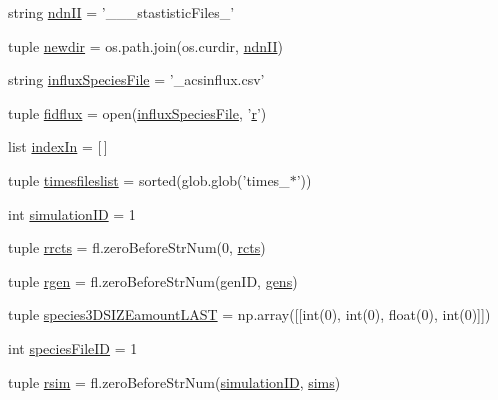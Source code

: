 \begin{DoxyCompactItemize}
string \hyperlink{namespacegeneral_statistics_a7ccf9a2d306ba41029a6c988dea19484}{ndn\-I\-I} = '\-\_\-\-\_\-\_\-stastistic\-Files\-\_\-'
\item 
tuple \hyperlink{namespacegeneral_statistics_a862af869b2c09a9bcb32f2c159d387e8}{newdir} = os.\-path.\-join(os.\-curdir, \hyperlink{namespacegeneral_statistics_a7ccf9a2d306ba41029a6c988dea19484}{ndn\-I\-I})
\item 
string \hyperlink{namespacegeneral_statistics_adfaa9da42539b29b71a53ddb2da53688}{influx\-Species\-File} = '\-\_\-acsinflux.\-csv'
\item 
tuple \hyperlink{namespacegeneral_statistics_a709d2fc5d6a459dbc9c4a04023635a20}{fidflux} = open(\hyperlink{namespacegeneral_statistics_adfaa9da42539b29b71a53ddb2da53688}{influx\-Species\-File}, '\hyperlink{_k_s_search_launcher_8m_ac862e7284527eb913b1351c8bfb8e079}{r}')
\item 
list \hyperlink{namespacegeneral_statistics_a5182af5b7ba2ac034a2be23a49197e8e}{index\-In} = \mbox{[}$\,$\mbox{]}
\item 
tuple \hyperlink{namespacegeneral_statistics_a999cd7acfeb999ca44418154c38bd0f6}{timesfileslist} = sorted(glob.\-glob('times\-\_\-$\ast$'))
\item 
int \hyperlink{namespacegeneral_statistics_a6f463c2d878793522d2ac91f1aaa8bc2}{simulation\-I\-D} = 1
\item 
tuple \hyperlink{namespacegeneral_statistics_a6cf3e4aec08e23edc7453e9dc795360e}{rrcts} = fl.\-zero\-Before\-Str\-Num(0, \hyperlink{namespacegeneral_statistics_a96c2985cd728ad6a5b6b5da7ae6d410e}{rcts})
\item 
tuple \hyperlink{namespacegeneral_statistics_a9f0e3da38cc8d932786debb2d495a13b}{rgen} = fl.\-zero\-Before\-Str\-Num(gen\-I\-D, \hyperlink{namespacegeneral_statistics_a973d65dc8f8e3c00253543a466ec0482}{gens})
\item 
tuple \hyperlink{namespacegeneral_statistics_a34b463634037dcf1dff3e5c03eb9d169}{species3\-D\-S\-I\-Z\-Eamount\-L\-A\-S\-T} = np.\-array(\mbox{[}\mbox{[}int(0), int(0), float(0), int(0)\mbox{]}\mbox{]})
\item 
int \hyperlink{namespacegeneral_statistics_a6b94bc4781eb4017a82145d7e6260e61}{species\-File\-I\-D} = 1
\item 
tuple \hyperlink{namespacegeneral_statistics_a2dfa50767faeb2e6493518af2b17dec0}{rsim} = fl.\-zero\-Before\-Str\-Num(\hyperlink{namespacegeneral_statistics_a6f463c2d878793522d2ac91f1aaa8bc2}{simulation\-I\-D}, \hyperlink{namespacegeneral_statistics_ab1c429f24e411b4f961a86e7a3f53cf1}{sims})

\end{DoxyCompactItemize}
